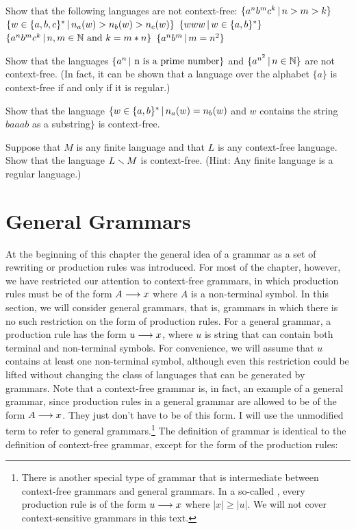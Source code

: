 \begin{exercises}

\problem Show that the following languages are not context-free:
\ppart $\{a^nb^mc^k\,|\, n>m>k\}$
\ppart $\{w\in\{a,b,c\}^*\,|\, n_a(w)>n_b(w)>n_c(w)\}$
\ppart $\{www\,|\, w\in\{a,b\}^*\}$
\ppart $\{a^nb^mc^k\,|\, n,m\in{\mathbb N}\text{ and } k=m*n\}$
\ppart $\{a^nb^m\,|\, m=n^2\}$

\problem Show that the languages $\{a^n\,|\, \,\text{n is a prime number}\}$
and $\{a^{n^2}\,|\, n\in {\mathbb N}\}$ are not context-free.  (In fact, it 
can be shown that a language over the alphabet $\{a\}$ is
context-free if and only if it is regular.)

\problem Show that the language $\{w\in\{a,b\}^*\,|\, n_a(w)=n_b(w)$
and $w$ contains the string $baaab$ as a substring$\}$ is context-free.

\problem Suppose that $M$ is any finite language and that
$L$ is any context-free language.  Show that the language
$L\smallsetminus M$ is context-free.  (Hint: Any finite language is a
regular language.)

\end{exercises}



\section{General Grammars}\label{S-grammars-5}

At the beginning of this chapter the general idea of a grammar as a set of
rewriting or production rules was introduced.  For most of the chapter, however,
we have restricted our attention to context-free grammars, in which production
rules must be of the form $A\longrightarrow x$ where $A$ is a non-terminal symbol.
In this section, we will consider general grammars, that is, grammars in which
there is no such restriction on the form of production rules.  For a general
grammar, a production rule has the form $u\longrightarrow x$, where $u$ is string
that can contain both terminal and non-terminal symbols.  For convenience, we
will assume that $u$ contains at least one non-terminal symbol, although
even this restriction could be lifted without changing the class of languages
that can be generated by grammars.  Note that a context-free grammar is, in fact,
an example of a general grammar, since production rules in a general grammar
are allowed to be of the form $A\longrightarrow x$.  They just don't have to be of
this form.  I will use the unmodified term  to
refer to general grammars.\footnote{There is another special type of grammar that
is intermediate between context-free grammars and general grammars.  In a
so-called , every production rule is of the form
$u\longrightarrow x$ where $|x|\ge|u|$.  We will not cover context-sensitive grammars in
this text.}  The definition of grammar is identical to the
definition of context-free grammar, except for the form of the production rules:


